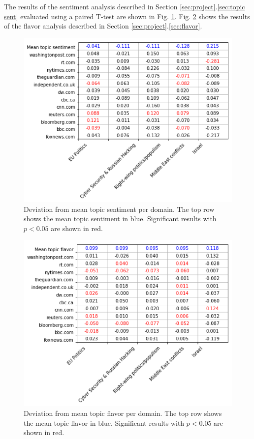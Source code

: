 \documentclass[final]{ieee}
\begin{document}
The results of the sentiment analysis described in Section \ref{sec:project}.\ref{sec:topic sent} evaluated using a paired T-test are shown in Fig. \ref{fig:mean_sent}. Fig. \ref{fig:mean_flavor} shows the results of the flavor analysis described in Section \ref{sec:project}.\ref{sec:flavor}.

\begin{figure}[!hbt]
  
  \centering
    \includegraphics[width=\columnwidth]{mean_sent.png}
    \caption{Deviation from mean topic sentiment per domain. The top row shows the mean topic sentiment in blue. Significant results with $p < 0.05$ are shown in red.}
  \label{fig:mean_sent}
\end{figure}

\begin{figure}[!hbt]
  
  \centering
    \includegraphics[width=\columnwidth]{mean_flavor.png}
    \caption{Deviation from mean topic flavor per domain. The top row shows the mean topic flavor in blue. Significant results with $p < 0.05$ are shown in red.}
  \label{fig:mean_flavor}
\end{figure}
\end{document}

